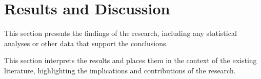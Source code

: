 \chapter{Results and Discussion}
This section presents the findings of the research, including any statistical
analyses or other data that support the conclusions.

This section interprets the results and places them in the context of the
existing literature, highlighting the implications and contributions of the
research.
